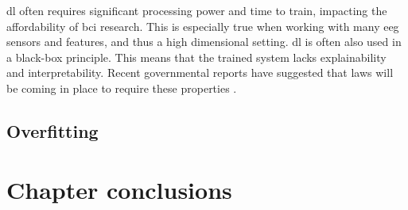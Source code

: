 \lipsum[1-3]

\Gls{dl} often requires significant processing power and time to train, impacting the affordability of \gls{bci} research.
This is especially true when working with many \gls{eeg} sensors and features, and thus a high dimensional setting. 
\Gls{dl} is often also used in a black-box principle.
This means that the trained system lacks explainability and interpretability.
Recent governmental reports have suggested that laws will be coming in place to require these properties \citep{eu_ai_blackbox_report, explainable_ai_policy}.


\subsection{Overfitting}
\label{subsec:processing_signals_common_issues_overfitting}



\lipsum[1-5]

\section{Chapter conclusions}
\label{sec:processing_signals_summary}

\lipsum[1-3]